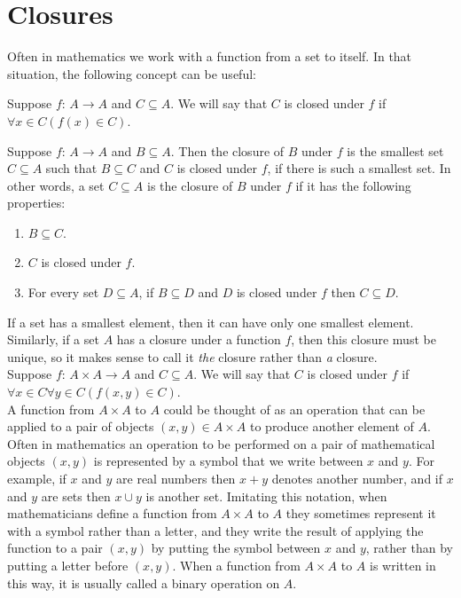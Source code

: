 \documentclass{article}
\begin{document}
\section{Closures}
Often in mathematics we work with a function from a set to itself. In that situation, the following concept can be useful:
\begin{center}
Suppose $f \text{: } A \to A$ and $C \subseteq A$. We will say that $C$ is \gls{closed} under $f$ if $\forall x \in C(f(x) \in C)$.
\end{center}
Suppose $f \text{: } A \to A$ and $B \subseteq A$. Then the \gls{closure} of $B$ under $f$ is the smallest set $C \subseteq A$ such that $B \subseteq C$ and $C$ is closed under $f$, if there is such a smallest set. In other words, a set $C \subseteq A$ is the closure of $B$ under $f$ if it has the following properties:
\begin{enumerate}
    \item $B \subseteq C$.
    \item $C$ is closed under $f$.
    \item For every set $D \subseteq A$, if $B \subseteq D$ and $D$ is closed under $f$ then $C \subseteq D$.
\end{enumerate}
If a set has a smallest element, then it can have only one smallest element. Similarly, if a set $A$ has a closure under a function $f$, then this closure must be unique, so it makes sense to call it \textit{the} closure rather than \textit{a} closure.\\

\noindent Suppose $f \text{: } A \times A \to A$ and $C \subseteq A$. We will say that $C$ is closed under $f$ if $\forall x \in C \forall y \in C(f(x,y) \in C)$.\\

\noindent A function from $A \times A$ to $A$ could be thought of as an operation that can be applied to a pair of objects $(x, y) \in A \times A$ to produce another element of $A$. Often in mathematics an operation to be performed on a pair of mathematical objects $(x, y)$ is represented by a symbol that we write between $x$ and $y$. For example, if $x$ and $y$ are real numbers then $x + y$ denotes another number, and if $x$ and $y$ are sets then $x \cup y$ is another set. Imitating this notation, when mathematicians define a function from $A \times A$ to $A$ they sometimes represent it with a symbol rather than a letter, and they write the result of applying the function to a pair $(x, y)$ by putting the symbol between $x$ and $y$, rather than by putting a letter before $(x, y)$. When a function from $A \times A$ to $A$ is written in this way, it is usually called a \gls{binary operation} on $A$.

\clearpage
\printglossary[type=\acronymtype,style=long]  %
\printglossary[type=symbolslist,style=long]   %
\printglossary[type=main]                     %
\end{document}
